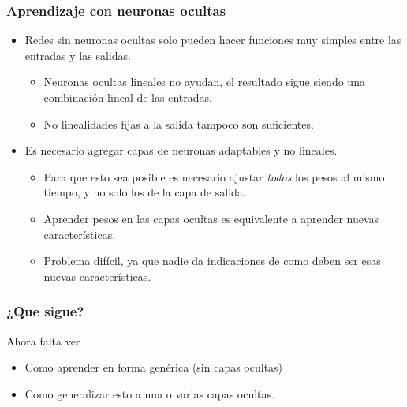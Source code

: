 \documentclass{beamer}
\begin{document}
\begin{frame}
  \frametitle{Aprendizaje con neuronas ocultas}

  \begin{itemize}
  \item Redes sin neuronas ocultas solo pueden hacer funciones muy
    simples entre las entradas y las salidas.
    \begin{itemize}
    \item Neuronas ocultas lineales no ayudan, el resultado sigue
      siendo una combinación lineal de las entradas.
    \item No linealidades fijas a la salida tampoco son suficientes.
    \end{itemize}
  \item Es necesario agregar capas de neuronas adaptables y no
    lineales.
    \begin{itemize}
    \item Para que esto sea posible es necesario ajustar \emph{todos}
      los pesos al mismo tiempo, y no solo los de la capa de salida.
    \item Aprender pesos en las capas ocultas es equivalente a
      aprender nuevas características.
    \item Problema difícil, ya que nadie da indicaciones de como deben
      ser esas nuevas características.
    \end{itemize}
  \end{itemize}
  
\end{frame}

\begin{frame}
  \frametitle{¿Que sigue?}
  
  \begin{block}{}
    Ahora falta ver
    \begin{itemize}
    \item Como aprender en forma genérica (sin capas ocultas)
    \item Como generalizar esto a una o varias capas ocultas.
    \end{itemize}
  \end{block}
\end{frame}
\end{document}
